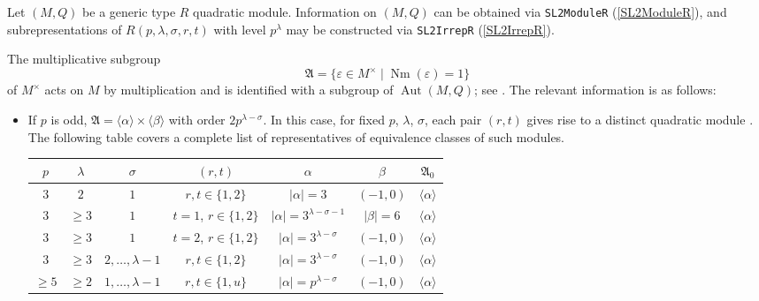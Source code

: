 \documentclass[a4paper,11pt]{report}
\begin{document}
{{{ Let $(M,Q)$ be a generic type $R$ quadratic module. Information on $(M,Q)$ can be obtained via \texttt{SL2ModuleR} (\ref{SL2ModuleR}), and subrepresentations of $R(p,\lambda,\sigma,r,t)$ with level $p^\lambda$ may be constructed via \texttt{SL2IrrepR} (\ref{SL2IrrepR}). 

 The multiplicative subgroup 
\[\mathfrak{A} = \{\varepsilon \in M^\times \mid \operatorname{Nm}(\varepsilon)
= 1 \}\]
 of $M^\times$ acts on $M$ by multiplication and is identified with a subgroup of $\operatorname{Aut}(M,Q)$; see \cite[Section 2.3 - 2.4]{NW76}. The relevant information is as follows: 
\begin{itemize}
\item If $p$ is odd, $\mathfrak{A} = \langle\alpha\rangle \times \langle\beta\rangle$ with order $2p^{\lambda-\sigma}$. In this case, for fixed $p$, $\lambda$, $\sigma$, each pair $(r,t)$ gives rise to a distinct quadratic module \cite[Satz 4]{Nobs1}. The following table covers a complete list of representatives of equivalence
classes of such modules. \begin{center}
\begin{tabular}{ccccccc}$p$&
$\lambda$&
$\sigma$&
$(r,t)$&
$\alpha$&
$\beta$&
$\mathfrak{A}_0$\\
\hline
$3$&
$2$&
$1$&
$r,t \in \{1,2\}$&
$|\alpha| = 3$&
$(-1,0)$&
$\langle \alpha \rangle$\\
$3$&
$\geq 3$&
$1$&
$t=1$, $r \in \{1,2\}$&
$|\alpha| = 3^{\lambda-\sigma-1}$&
$|\beta| = 6$&
$\langle \alpha \rangle$\\
$3$&
$\geq 3$&
$1$&
$t=2$, $r \in \{1,2\}$&
$|\alpha| = 3^{\lambda-\sigma}$&
$(-1,0)$&
$\langle \alpha \rangle$\\
$3$&
$\geq 3$&
$2,\dots,\lambda-1$&
$r,t \in \{1,2\}$&
$|\alpha| = 3^{\lambda-\sigma}$&
$(-1,0)$&
$\langle \alpha \rangle$\\
$\geq 5$&
$\geq 2$&
$1, \dots,\lambda - 1$&
$r,t \in \{1,u\}$&
$|\alpha| = p^{\lambda-\sigma}$&
$(-1,0)$&
$\langle \alpha \rangle$\\
\end{tabular}\\[2mm]
\end{center}



\end{itemize}}}}
\end{document}
